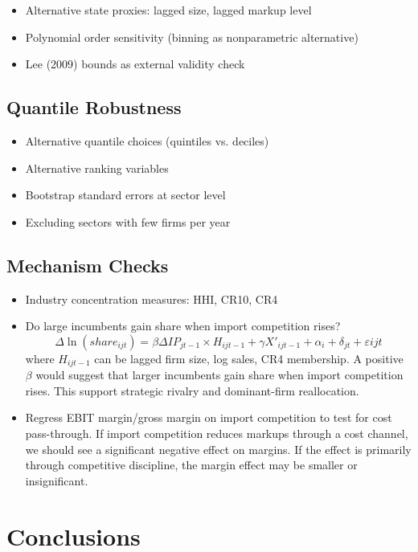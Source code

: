 \documentclass[12pt]{article}
\begin{document}
\begin{itemize}
    \item Alternative state proxies: lagged size, lagged markup level
    \item Polynomial order sensitivity (binning as nonparametric alternative)
    \item Lee (2009) bounds as external validity check
\end{itemize}

\subsection{Quantile Robustness}

\begin{itemize}
    \item Alternative quantile choices (quintiles vs. deciles)
    \item Alternative ranking variables
    \item Bootstrap standard errors at sector level
    \item Excluding sectors with few firms per year
\end{itemize}

\subsection{Mechanism Checks}

\begin{itemize}
    \item Industry concentration measures: HHI, CR10, CR4
    \item Do large incumbents gain share when import competition rises? 
    \[
    \Delta \ln (share_{ijt}) = \beta \Delta IP_{jt-1} \times H_{ijt-1} + \gamma X'_{ijt-1} + \alpha_i + \delta_{jt} + \varepsilon{ijt}
    \]
    where $H_{ijt-1}$ can be lagged firm size, log sales, CR4 membership. A positive $\beta$ would suggest that larger incumbents gain share when import competition rises. This support strategic rivalry and dominant-firm reallocation. 
    \item Regress EBIT margin/gross margin on import competition to test for cost pass-through. If import competition reduces markups through a cost channel, we should see a significant negative effect on margins. If the effect is primarily through competitive discipline, the margin effect may be smaller or insignificant.
\end{itemize}

\section{Conclusions}
\end{document}
